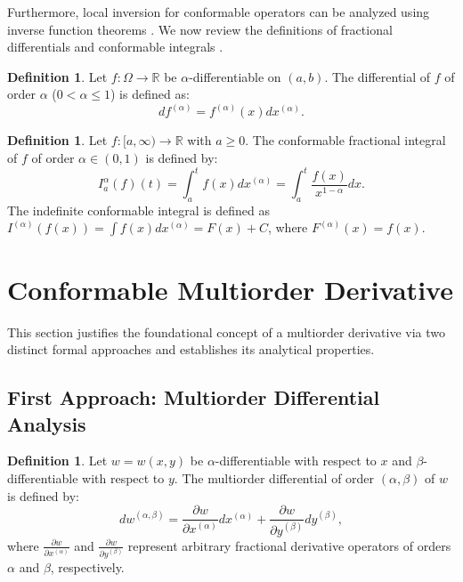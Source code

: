 \documentclass[oneside,10pt]{article}
\theoremstyle{plain}
\theoremstyle{definition}
\newtheorem{definition}[theorem]{Definition}
\begin{document}
Furthermore, local inversion for conformable operators can be analyzed using inverse function theorems \cite{Asbab2025}. We now review the definitions of fractional differentials and conformable integrals \cite{Cadenas2025, Khalil2014}.

\begin{definition}
Let $f:\Omega \to \mathbb{R}$ be $\alpha$-differentiable on $(a,b)$. The differential of $f$ of order $\alpha$ ($0 < \alpha \le 1$) is defined as:
\begin{equation}
df^{(\alpha)} = f^{(\alpha)}(x) dx^{(\alpha)}.
\end{equation}
\end{definition}

\begin{definition}\label{def:conf_integral}
Let $f:[a,\infty) \to \mathbb{R}$ with $a \ge 0$. The conformable fractional integral of $f$ of order $\alpha \in (0,1)$ is defined by:
\begin{equation}
I_a^\alpha(f)(t) = \int_a^t f(x) dx^{(\alpha)} = \int_a^t \frac{f(x)}{x^{1-\alpha}} dx.
\end{equation}
The indefinite conformable integral is defined as $I^{(\alpha)}(f(x)) = \int f(x) dx^{(\alpha)} = F(x) + C$, where $F^{(\alpha)}(x) = f(x)$.
\end{definition}

\section{Conformable Multiorder Derivative}\label{sec:multi_der}

This section justifies the foundational concept of a multiorder derivative via two distinct formal approaches and establishes its analytical properties.

\subsection{First Approach: Multiorder Differential Analysis}

\begin{definition}
Let $w = w(x,y)$ be $\alpha$-differentiable with respect to $x$ and $\beta$-differentiable with respect to $y$. The multiorder differential of order $(\alpha, \beta)$ of $w$ is defined by:
\begin{equation}\label{eq:multi_diff_def}
dw^{(\alpha,\beta)} = \frac{\partial w}{\partial x^{(\alpha)}} dx^{(\alpha)} + \frac{\partial w}{\partial y^{(\beta)}} dy^{(\beta)},
\end{equation}
where $\frac{\partial w}{\partial x^{(\alpha)}}$ and $\frac{\partial w}{\partial y^{(\beta)}}$ represent arbitrary fractional derivative operators of orders $\alpha$ and $\beta$, respectively.
\end{definition}
\end{document}
